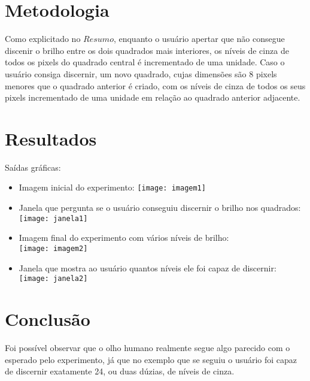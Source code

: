 \documentclass[conference]{IEEEtran}
\begin{document}
\section{Metodologia} 
\label{sec:meth} 
Como explicitado no $Resumo $, enquanto o usu\'ario apertar que n\~ao consegue discenir o brilho entre os dois quadrados mais interiores, os n\'iveis de cinza de todos os pixels do quadrado central \'e incrementado de uma unidade. Caso o usu\'ario consiga discernir, um novo quadrado, cujas dimens\~oes s\~ao 8 pixels menores que o quadrado anterior \'e criado, com os n\'iveis de cinza de todos os seus pixels incrementado de uma unidade em rela\c{c}\~ao ao quadrado anterior adjacente.

\section{Resultados} 
\label{sec:meth} 
Sa\'idas gr\'aficas:\\
\begin{itemize}
  	\item Imagem inicial do experimento:
		\vspace{2\baselineskip}\vspace{-\parskip}
		\centering\texttt{[image: imagem1]}
		\vspace{2\baselineskip}\vspace{-\parskip}

	\item Janela que pergunta se o usu\'ario conseguiu discernir o brilho nos quadrados:\\
		\vspace{2\baselineskip}\vspace{-\parskip}
		\texttt{[image: janela1]}
		\vspace{2\baselineskip}\vspace{-\parskip}
	
	\item Imagem final do experimento com v\'arios n\'iveis de brilho:\\
		\vspace{2\baselineskip}\vspace{-\parskip}
		\texttt{[image: imagem2]}
		\vspace{2\baselineskip}\vspace{-\parskip}

	\item Janela que mostra ao usu\'ario quantos n\'iveis ele foi capaz de discernir:\\
		\vspace{2\baselineskip}\vspace{-\parskip}
		\texttt{[image: janela2]}
		\vspace{2\baselineskip}\vspace{-\parskip}
		
 \end{itemize}

\section{Conclus\~ao} 
\label{sec:meth} 
Foi poss\'ivel observar que o olho humano realmente segue algo parecido com o esperado pelo experimento, j\'a que no exemplo que se seguiu o usu\'ario foi capaz de discernir exatamente 24, ou duas d\'uzias, de n\'iveis de cinza.
\end{document}
